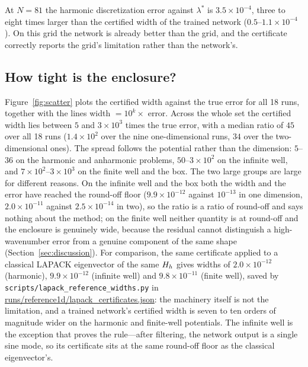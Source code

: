 At $N=81$ the harmonic discretization error against $\lambda^\ast$ is
$3.5\times10^{-4}$, three to eight times larger than the certified width of
the trained network ($0.5$--$1.1\times10^{-4}$). On this grid the network is
already better than the grid, and the certificate correctly reports the grid's
limitation rather than the network's.

\subsection{How tight is the enclosure?}
\label{sec:tightness}

Figure~\ref{fig:scatter} plots the certified width against the true error for
all 18 runs, together with the lines width $=10^{k}\times$ error. Across the
whole set the certified width lies between $5$ and $3\times10^{3}$ times the
true error, with a median ratio of $45$ over all 18 runs ($1.4\times10^{2}$
over the nine one-dimensional runs, $34$ over the two-dimensional ones). The
spread follows the potential rather than the dimension: $5$--$36$ on the
harmonic and anharmonic problems, $50$--$3\times10^{2}$ on the infinite well,
and $7\times10^{2}$--$3\times10^{3}$ on the finite well and the box. The two
large groups are large for different reasons. On the infinite well and the box
both the width and the error have reached the round-off floor
($9.9\times10^{-12}$ against $10^{-13}$ in one dimension, $2.0\times10^{-11}$
against $2.5\times10^{-14}$ in two), so the ratio is a ratio of round-off and
says nothing about the method; on the finite well neither quantity is at
round-off and the enclosure is genuinely wide, because the residual cannot
distinguish a high-wavenumber error from a genuine component of the same shape
(Section~\ref{sec:discussion}). For comparison, the same certificate applied to a
classical LAPACK eigenvector of the same $H_h$ gives widths of
$2.0\times10^{-12}$ (harmonic), $9.9\times10^{-12}$ (infinite well) and
$9.8\times10^{-11}$ (finite well), saved by
\texttt{scripts/lapack\_reference\_widths.py} in
\url{runs/reference1d/lapack_certificates.json}: the machinery itself is not the limitation,
and a trained network's certified width is seven to ten orders of magnitude
wider on the harmonic and finite-well potentials. The infinite well is the
exception that proves the rule---after filtering, the network output is a
single sine mode, so its certificate sits at the same round-off floor as the
classical eigenvector's.

